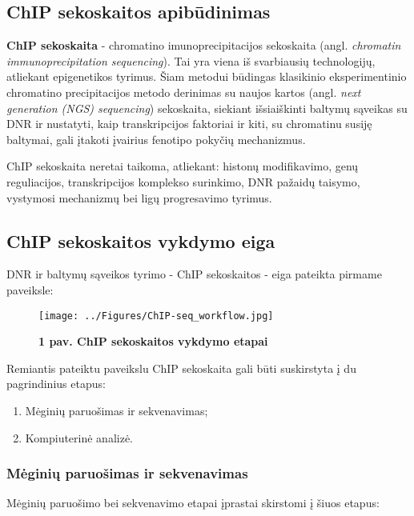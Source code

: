 \documentclass[12pt]{article}
\begin{document}
\subsection{ChIP sekoskaitos apibūdinimas}
\textbf{ChIP sekoskaita} - chromatino imunoprecipitacijos sekoskaita (angl.
\emph{chromatin immunoprecipitation sequencing}). Tai yra viena iš svarbiausių
technologijų, atliekant epigenetikos tyrimus\cite{ARTICLE1}. Šiam metodui
būdingas klasikinio eksperimentinio chromatino precipitacijos metodo derinimas
su naujos kartos (angl. \emph{next generation (NGS) sequencing}) sekoskaita,
siekiant išsiaiškinti baltymų sąveikas su DNR ir nustatyti, kaip transkripcijos
faktoriai ir kiti, su chromatinu susiję baltymai, gali įtakoti įvairius fenotipo
pokyčių mechanizmus\cite{ARTICLE2}.

ChIP sekoskaita neretai taikoma, atliekant: histonų modifikavimo, genų
reguliacijos, transkripcijos komplekso surinkimo, DNR pažaidų taisymo,
vystymosi mechanizmų bei ligų progresavimo tyrimus.


\subsection{ChIP sekoskaitos vykdymo eiga}

DNR ir baltymų sąveikos tyrimo - ChIP sekoskaitos - eiga pateikta pirmame
paveiksle:

\begin{figure}[ht]
    \begin{center}
        \texttt{[image: ../Figures/ChIP-seq\_workflow.jpg]}
        \vspace{-1\baselineskip}
        \caption*{\small\textbf{1 pav. ChIP sekoskaitos vykdymo etapai}}
    \end{center}
\end{figure}

Remiantis pateiktu paveikslu ChIP sekoskaita gali būti suskirstyta į du
pagrindinius etapus:

\begin{enumerate}
    \item Mėginių paruošimas ir sekvenavimas;
    \item Kompiuterinė analizė.
\end{enumerate}

\subsubsection{Mėginių paruošimas ir sekvenavimas}
Mėginių paruošimo bei sekvenavimo etapai įprastai skirstomi į šiuos etapus:
\end{document}
